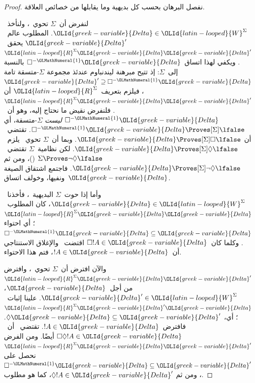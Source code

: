 \documentclass[../../../include/open-logic-section]{subfiles}
\begin{document}
\begin{proof}
  نفصل البرهان بحسب كل بديهية وما يقابلها من خصائص العلاقة.

  لنفرض أن~$\Sigma$ تحوي~، ولنأخذ~$\OLId{greek-variable}{Delta} \in \OLId{latin-looped}{W}^\Sigma$.
  المطلوب عالم~$\OLId{greek-variable}{Delta}'$ يحقق~$\OLId{latin-looped}{R}^\Sigma \OLId{greek-variable}{Delta}\OLId{greek-variable}{Delta}'$.
  ويكفي لهذا اتساق~$\Box^{-\OLMathNumeral{1}}\OLId{greek-variable}{Delta}$ بالنسبة إلى~$\Sigma$:
  إذ تتيح مبرهنة ليندنباوم عندئذ مجموعة $\Sigma$-متسقة تامة
  $\OLId{greek-variable}{Delta}' \supseteq \Box^{-\OLMathNumeral{1}}\OLId{greek-variable}{Delta}$، فيلزم بتعريف~$\OLId{latin-looped}{R}^\Sigma$
  أن
  $\OLId{latin-looped}{R}^\Sigma \OLId{greek-variable}{Delta}\OLId{greek-variable}{Delta}'$.
  فلنفرض نقيض ما نحتاج إليه، وهو أن~$\Box^{-\OLMathNumeral{1}}\OLId{greek-variable}{Delta}$
  \emph{ليست} $\Sigma$-متسقة، أي $\Box^{-\OLMathNumeral{1}}\OLId{greek-variable}{Delta} \Proves[\Sigma] \lfalse$.
  تقتضي~ أن
  $\OLId{greek-variable}{Delta} \Proves[\Sigma] \Box\lfalse$.
  وبما أن~$\Sigma$ تحوي~ يلزم~$\OLId{greek-variable}{Delta} \Proves[\Sigma] \Diamond\lfalse$.
  لكن نظامية~$\Sigma$ تقتضي~$\Sigma \Proves \lnot\Diamond \lfalse$
  ()، ومن ثم
  $\OLId{greek-variable}{Delta} \Proves[\Sigma] \lnot\Diamond \lfalse$.
  فاجتمع اشتقاق الصيغة ونفيها، وخولف اتساق~$\OLId{greek-variable}{Delta}$.

  وأما إذا حوت~$\Sigma$ البديهية~، فأخذنا~$\OLId{greek-variable}{Delta} \in \OLId{latin-looped}{W}^\Sigma$،
  كان المطلوب~$\OLId{latin-looped}{R}^\Sigma \OLId{greek-variable}{Delta}\OLId{greek-variable}{Delta}$؛ أي احتواء
  $\Box^{-\OLMathNumeral{1}}\OLId{greek-variable}{Delta} \subseteq \OLId{greek-variable}{Delta}$.
  وكلما كان~$\Box!A \in \OLId{greek-variable}{Delta}$ اقتضت~ والإغلاق الاستنتاجي
  أن~$!A \in \OLId{greek-variable}{Delta}$، فتم هذا الاحتواء.

  والآن افترض أن~$\Sigma$ تحوي~، وافترض
  $\OLId{latin-looped}{R}^\Sigma \OLId{greek-variable}{Delta}\OLId{greek-variable}{Delta}'$ من أجل~$\OLId{greek-variable}{Delta}$، $\OLId{greek-variable}{Delta}' \in \OLId{latin-looped}{W}^\Sigma$.
  علينا إثبات~$\OLId{latin-looped}{R}^\Sigma \OLId{greek-variable}{Delta}'\OLId{greek-variable}{Delta}$؛ أي،
  $\Diamond\OLId{greek-variable}{Delta} \subseteq \OLId{greek-variable}{Delta}'$. فافترض~$!A \in \OLId{greek-variable}{Delta}$.
  تقتضي~ أن~$\Box\Diamond!A \in \OLId{greek-variable}{Delta}$ أيضًا. ومن الفرض
  $\OLId{latin-looped}{R}^\Sigma \OLId{greek-variable}{Delta}\OLId{greek-variable}{Delta}'$ نحصل على
  $\Box^{-\OLMathNumeral{1}}\OLId{greek-variable}{Delta} \subseteq \OLId{greek-variable}{Delta}'$، ومن ثم
  $\Diamond!A \in \OLId{greek-variable}{Delta}'$، كما هو مطلوب.


\end{proof}
\end{document}
